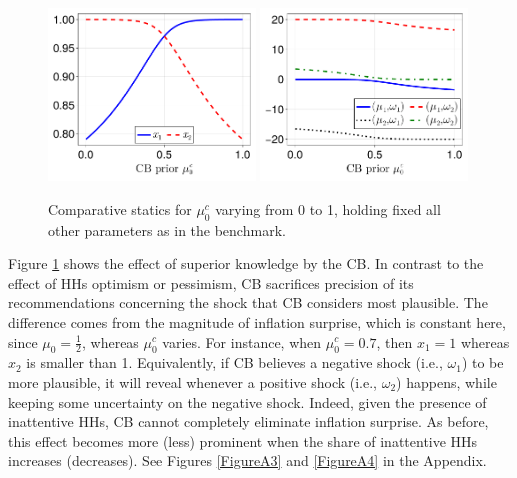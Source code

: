 \documentclass[12pt,a4paper]{article}
\begin{document}
\begin{figure}[H]
\centering
\includegraphics[width=0.49\textwidth]{figures/V11/γ=10.0-μ_0=0.5-α=1.0-θ=1.0-δ=0.5-ω_1=1.0-ω_2=-1.0/communication/fig_optimal_x_by_μ_0_c.pdf}
\includegraphics[width=0.49\textwidth]{figures/V11/γ=10.0-μ_0=0.5-α=1.0-θ=1.0-δ=0.5-ω_1=1.0-ω_2=-1.0/communication/fig_optimal_γ_by_μ_0_c.pdf}
\caption{Comparative statics for $\mu_0^c$ varying from 0 to 1, holding fixed all other parameters as in the benchmark.}
\label{Figure2}
\end{figure}

Figure \ref{Figure2} shows the effect of superior knowledge by the CB. In contrast to the effect of HHs optimism or pessimism, CB sacrifices precision of its recommendations concerning the shock that CB considers most plausible. The difference comes from the magnitude of inflation surprise, which is constant here, since $\mu_0=\frac{1}{2}$, whereas $\mu_0^c$ varies. For instance, when $\mu_0^c=0.7$, then $x_1=1$ whereas $x_2$ is smaller than 1. Equivalently, if CB believes a negative shock (i.e., $\omega_1$) to be more plausible, it will reveal whenever a positive shock (i.e., $\omega_2$) happens, while keeping some uncertainty on the negative shock. Indeed, given the presence of inattentive HHs, CB cannot completely eliminate inflation surprise. As before, this effect becomes more (less) prominent when the share of inattentive HHs increases (decreases). See Figures \ref{FigureA3} and \ref{FigureA4} in the Appendix.
\end{document}

